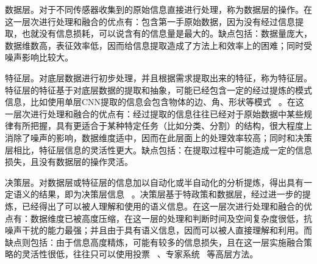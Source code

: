 数据层。对于不同传感器收集到的原始信息直接进行处理，称为数据层的操作。在这一层次进行处理和融合的优点有：包含第一手原始数据，因为没有经过信息提取，也就没有信息损耗，可以说含有的信息量是最大的。缺点包括：数据量庞大，数据维数高，表征效率低，因而给信息提取造成了方法上和效率上的困难；同时受噪声影响比较大。

特征层。对底层数据进行初步处理，并且根据需求提取出来的特征，称为特征层。特征层的特征基于对底层数据的提取和抽象，可能已经包含一定的经过提炼的模式信息，比如使用单层CNN提取的信息会包含物体的边、角、形状等模式~ 。在这一层次进行处理和融合的优点有：经过提取的信息往往已经对于原始数据中某些规律有所把握，具有更适合于某种特定任务（比如分类、分割）的结构，很大程度上消除了噪声的影响，数据维度适中，因而在此层面上的处理效率较高；同时和决策层相比，特征层信息的灵活性更大。缺点包括：在提取过程中可能造成一定的信息损失，且没有数据层的操作灵活。

决策层。对数据层或特征层的信息加以自动化或半自动化的分析提炼，得出具有一定语义的结果，即为决策层信息~ 。决策层基于特政策和数据层，经过进一步的提炼，已经得出了可以被人理解和使用的语义信息。在这一层次进行处理和融合的优点有：数据维度已被高度压缩，在这一层的处理和判断时间及空间复杂度很低，抗噪声干扰的能力最强；并且由于具有语义信息，因而可以被人直接理解和利用。而缺点则包括：由于信息高度精炼，可能有较多的信息损失，且在这一层实施融合策略的灵活性很低，往往只可以使用投票~ 、专家系统~ 等高层方法。








